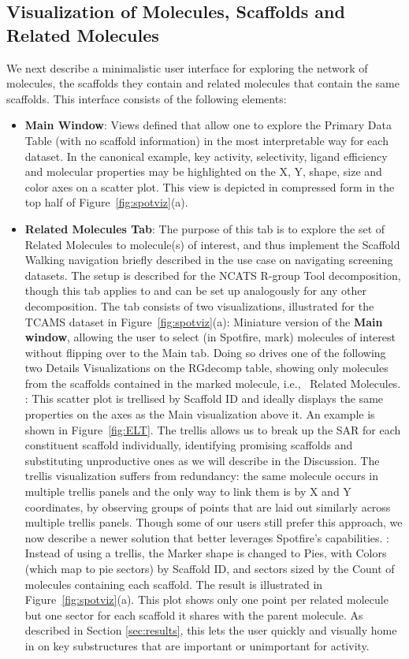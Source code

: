 \documentclass[journal=jacsat,biochem,manuscript=article]{achemso}
\newcommand*\fref[1]{Figure~\ref{fig:#1}}
\newcommand*\ie{i.e.,~}
\begin{document}
\subsection{Visualization of Molecules, Scaffolds and Related Molecules}

We next describe a minimalistic user interface for exploring the
network of molecules, the scaffolds they contain and related molecules
that contain the same scaffolds. This interface consists of the
following elements:
\begin{itemize}
\item {\bf Main Window}: Views defined that allow one to explore the
  Primary Data Table (with no scaffold information) in the most interpretable
  way for each dataset.  In the canonical example, key activity,
  selectivity, ligand efficiency and molecular properties may be
  highlighted on the X, Y, shape, size and color axes on a scatter  plot.
  This view is depicted in compressed form in the top half of \fref{spotviz}(a).
\item {\bf Related Molecules Tab}: The purpose of this tab is to explore the
  set of Related Molecules to molecule(s) of interest, and thus
  implement the Scaffold Walking navigation briefly described in the
  use case on navigating screening datasets.
  The setup is described for the NCATS R-group Tool decomposition,
  though this tab applies to and can be set up analogously for any
  other decomposition. The tab consists of two visualizations,
  illustrated for the TCAMS dataset in \fref{spotviz}(a):
  \subitem Miniature version of the {\bf Main window}, allowing the
  user to select (in Spotfire, mark) molecules of interest without
  flipping over to the Main tab. Doing so drives one of the following
  two Details Visualizations on the {RG}decomp table, showing only
  molecules from the scaffolds contained in the marked molecule, \ie
  Related Molecules.
  : This scatter
  plot is trellised by Scaffold ID and ideally displays the same
  properties on the axes as the Main visualization above it.  An
  example is shown in \fref{ELT}. The trellis allows us to break up
  the SAR for each constituent scaffold individually, identifying
  promising scaffolds and substituting unproductive ones as we will
  describe in the Discussion. The trellis visualization suffers from
  redundancy: the same molecule occurs in multiple trellis panels and
  the only way to link them is by X and Y coordinates, by observing
  groups of points that are laid out similarly across multiple trellis
  panels.  Though some of our users still prefer this approach, we now
  describe a newer solution that better leverages Spotfire's
  capabilities.
  : Instead of using a
  trellis, the Marker shape is changed to Pies, with Colors (which map
  to pie sectors) by Scaffold ID, and sectors sized by the Count of
  molecules containing each scaffold.  The result is illustrated in
  \fref{spotviz}(a). This plot shows only one point per related
  molecule but one sector for each scaffold it shares with the parent
  molecule.  As described in Section \ref{sec:results}, this lets the
  user quickly and visually home in on key substructures that are
  important or unimportant for activity.


\end{itemize}
\end{document}
